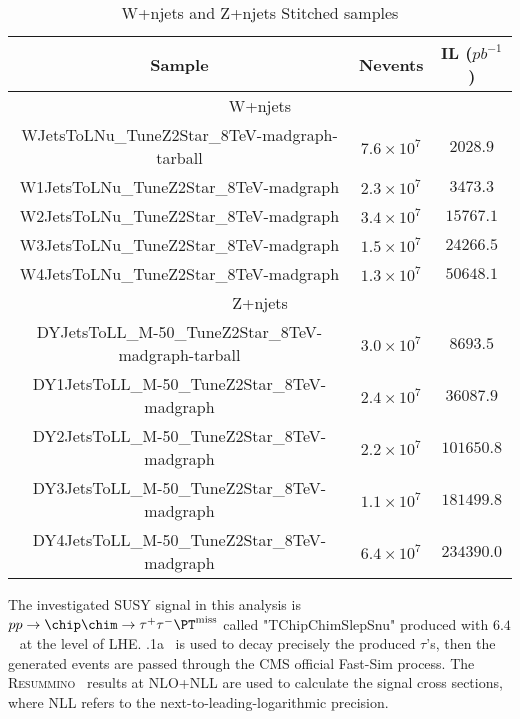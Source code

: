 \begin{table}[!h]
\begin{center}
\caption{W+njets and Z+njets Stitched samples}
\begin{tabular}{|c|c|c|}
\hline\hline
Sample    & Nevents  & IL ($pb^{-1}$) \\ \hline
\multicolumn{3}{|c|}{W+njets} \\\hline
WJetsToLNu\_TuneZ2Star\_8TeV-madgraph-tarball     & $7.6\times 10^{7}$ & $2028.9$  \\ \hline
W1JetsToLNu\_TuneZ2Star\_8TeV-madgraph            & $2.3\times 10^{7}$ & $3473.3$  \\ \hline
W2JetsToLNu\_TuneZ2Star\_8TeV-madgraph            & $3.4\times 10^{7}$ & $15767.1$ \\ \hline
W3JetsToLNu\_TuneZ2Star\_8TeV-madgraph            & $1.5\times 10^{7}$ & $24266.5$ \\ \hline
W4JetsToLNu\_TuneZ2Star\_8TeV-madgraph            & $1.3\times 10^{7}$ & $50648.1$ \\ \hline
\multicolumn{3}{|c|}{Z+njets} \\\hline
DYJetsToLL\_M-50\_TuneZ2Star\_8TeV-madgraph-tarball & $3.0\times 10^{7}$ & $8693.5$ \\ \hline
DY1JetsToLL\_M-50\_TuneZ2Star\_8TeV-madgraph        & $2.4\times 10^{7}$ & $36087.9$\\ \hline
DY2JetsToLL\_M-50\_TuneZ2Star\_8TeV-madgraph        & $2.2\times 10^{7}$ & $101650.8$\\ \hline
DY3JetsToLL\_M-50\_TuneZ2Star\_8TeV-madgraph        & $1.1\times 10^{7}$ & $181499.8$\\ \hline
DY4JetsToLL\_M-50\_TuneZ2Star\_8TeV-madgraph        & $6.4\times 10^{7}$ & $234390.0$\\ \hline
\hline
\end{tabular}
\label{Tab.Stitching}
\end{center}
\end{table}


The investigated SUSY signal in this analysis is {\small $pp \rightarrow \chip \chim \rightarrow \tau^+ \tau^- \MPT$} called {\small "TChipChimSlepSnu"} produced with \PYTHIA $6.4$ ~\cite{PYTHIA} at the level of LHE. .1a~\cite{Davidson:2010rw} is used to decay precisely the produced $\tau$'s, then the generated events are passed through the CMS official Fast-Sim process.
The \textsc{Resummino}~\cite{Fuks:2012qx,Fuks:2013vua,Fuks:2013lya} results at NLO+NLL are used to calculate the signal cross sections, where 
NLL refers to the next-to-leading-logarithmic precision.

